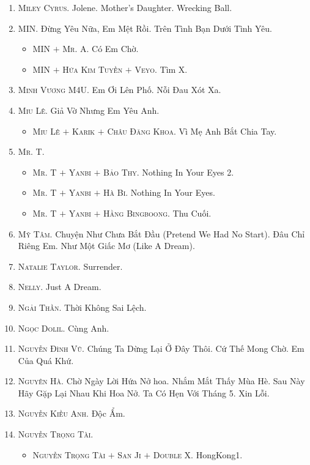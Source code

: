 \documentclass[oneside]{book}
\numberwithin{equation}{section}
\begin{document}
\begin{enumerate}
	\item \textsc{Miley Cyrus.} Jolene. Mother's Daughter. Wrecking Ball.
	\item \textsc{MIN.} Đừng Yêu Nữa, Em Mệt Rồi. Trên Tình Bạn Dưới Tình Yêu.
	\begin{itemize}
		\item \textsc{MIN $+$ Mr. A.} Có Em Chờ.
		\item \textsc{MIN $+$ Hứa Kim Tuyền $+$ Veyo.} Tìm X.
	\end{itemize}
	\item \textsc{Minh Vương M4U.} Em Ơi Lên Phố. Nỗi Đau Xót Xa.
	\item \textsc{Miu Lê.} Giả Vờ Nhưng Em Yêu Anh.
	\begin{itemize}
		\item \textsc{Miu Lê $+$ Karik $+$ Châu Đăng Khoa.} Vì Mẹ Anh Bắt Chia Tay.
	\end{itemize}
	\item \textsc{Mr. T.}
	\begin{itemize}
		\item \textsc{Mr. T $+$ Yanbi $+$ Bảo Thy.} Nothing In Your Eyes 2.
		\item \textsc{Mr. T $+$ Yanbi $+$ Hà Bi.} Nothing In Your Eyes.
		\item \textsc{Mr. T $+$ Yanbi $+$ Hằng Bingboong.} Thu Cuối.
	\end{itemize}
	\item \textsc{Mỹ Tâm.} Chuyện Như Chưa Bắt Đầu (Pretend We Had No Start). Đâu Chỉ Riêng Em. Như Một Giấc Mơ (Like A Dream).
	\item \textsc{Natalie Taylor.} Surrender.
	\item \textsc{Nelly.} Just A Dream.
	\item \textsc{Ngải Thần.} Thời Không Sai Lệch.
	\item \textsc{Ngọc Dolil.} Cùng Anh.
	\item \textsc{Nguyễn Đình Vũ.} Chúng Ta Dừng Lại Ở Đây Thôi. Cứ Thế Mong Chờ. Em Của Quá Khứ.
	\item \textsc{Nguyên Hà.} Chờ Ngày Lời Hứa Nở hoa. Nhắm Mắt Thấy Mùa Hè. Sau Này Hãy Gặp Lại Nhau Khi Hoa Nở. Ta Có Hẹn Với Tháng 5. Xin Lỗi.
	\item \textsc{Nguyễn Kiều Anh.} Độc Ẩm.
	\item \textsc{Nguyễn Trọng Tài.}
	\begin{itemize}
		\item \textsc{Nguyễn Trọng Tài $+$ San Ji $+$ Double X.} HongKong1.
	\end{itemize}

\end{enumerate}
\end{document}
